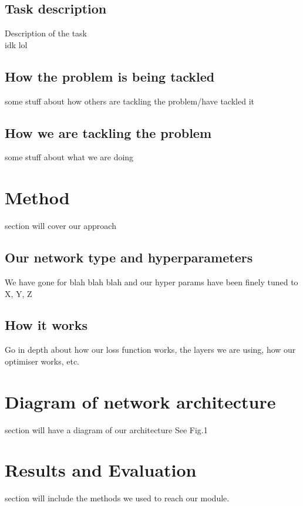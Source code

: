 \documentclass[journal]{./IEEEtran}
\begin{document}
	
	
	\subsection{Task description}
	Description of the task
	\\idk lol
	
	\subsection{How the problem is being tackled}
	some stuff about how others are tackling the problem/have tackled it
	
	\subsection{How we are tackling the problem}
	some stuff about what we are doing
	
	\section{Method}
	
	 section will cover our approach
	\subsection{Our network type and hyperparameters}
	We have gone for blah blah blah and our hyper params have been finely tuned to X, Y, Z
	
	\subsection{How it works}
	Go in depth about how our loss function works, the layers we are using, how our optimiser works, etc.
	
	\section{Diagram of network architecture}
	 section will have a diagram of our architecture
	See Fig.1
	
	\section{Results and Evaluation}
	 section will include the methods we used to reach our module.
	
\end{document}
